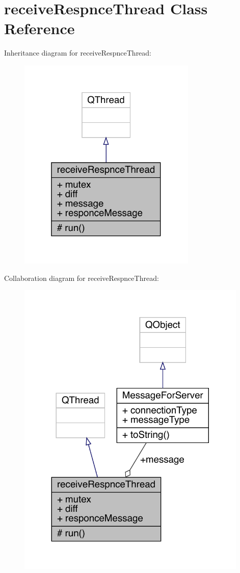 \hypertarget{a00221}{}\section{receive\+Respnce\+Thread Class Reference}
\label{a00221}


Inheritance diagram for receive\+Respnce\+Thread\+:
\nopagebreak
\begin{figure}[H]
\begin{center}
\leavevmode
\includegraphics[width=241pt]{d5/d0b/a00220}
\end{center}
\end{figure}


Collaboration diagram for receive\+Respnce\+Thread\+:
\nopagebreak
\begin{figure}[H]
\begin{center}
\leavevmode
\includegraphics[width=311pt]{dd/df3/a00219}
\end{center}
\end{figure}
